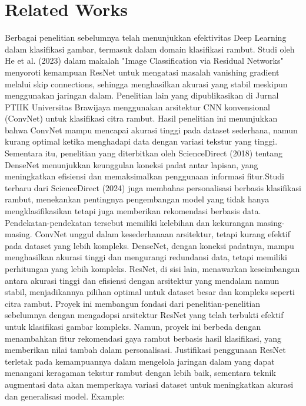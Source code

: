 \documentclass[12pt,a4paper]{article}
\begin{document}
\section{Related Works}
Berbagai penelitian sebelumnya telah menunjukkan efektivitas Deep Learning dalam klasifikasi gambar, termasuk dalam domain klasifikasi rambut. Studi oleh He et al. (2023) dalam makalah "Image Classification via Residual Networks" menyoroti kemampuan ResNet untuk mengatasi masalah vanishing gradient melalui skip connections, sehingga menghasilkan akurasi yang stabil meskipun menggunakan jaringan dalam. Penelitian lain yang dipublikasikan di Jurnal PTIIK Universitas Brawijaya menggunakan arsitektur CNN konvensional (ConvNet) untuk klasifikasi citra rambut. Hasil penelitian ini menunjukkan bahwa ConvNet mampu mencapai akurasi tinggi pada dataset sederhana, namun kurang optimal ketika menghadapi data dengan variasi tekstur yang tinggi. Sementara itu, penelitian yang diterbitkan oleh ScienceDirect (2018) tentang DenseNet menunjukkan keunggulan koneksi padat antar lapisan, yang meningkatkan efisiensi dan memaksimalkan penggunaan informasi fitur.Studi terbaru dari ScienceDirect (2024) juga membahas personalisasi berbasis klasifikasi rambut, menekankan pentingnya pengembangan model yang tidak hanya mengklasifikasikan tetapi juga memberikan rekomendasi berbasis data. Pendekatan-pendekatan tersebut memiliki kelebihan dan kekurangan masing-masing. ConvNet unggul dalam kesederhanaan arsitektur, tetapi kurang efektif pada dataset yang lebih kompleks. DenseNet, dengan koneksi padatnya, mampu menghasilkan akurasi tinggi dan mengurangi redundansi data, tetapi memiliki perhitungan yang lebih kompleks. ResNet, di sisi lain, menawarkan keseimbangan antara akurasi tinggi dan efisiensi dengan arsitektur yang mendalam namun stabil, menjadikannya pilihan optimal untuk dataset besar dan kompleks seperti citra rambut. Proyek ini membangun fondasi dari penelitian-penelitian sebelumnya dengan mengadopsi arsitektur ResNet yang telah terbukti efektif untuk klasifikasi gambar kompleks. Namun, proyek ini berbeda dengan menambahkan fitur rekomendasi gaya rambut berbasis hasil klasifikasi, yang memberikan nilai tambah dalam personalisasi. Justifikasi penggunaan ResNet terletak pada kemampuannya dalam mengelola jaringan dalam yang dapat menangani keragaman tekstur rambut dengan lebih baik, sementara teknik augmentasi data akan memperkaya variasi dataset untuk meningkatkan akurasi dan generalisasi model.
\noindent Example:
\lipsum[2] %
\end{document}
